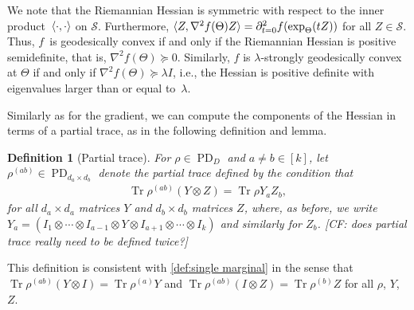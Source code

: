 \documentclass{article}
\newtheorem{definition}{Definition}
\newcommand{\ot}{\otimes}
\renewcommand{\vec}{\bm}
\newcommand\PD{\operatorname{PD}}
\newcommand\Sym{\mathcal{S}}
\newcommand\tr{\operatorname{Tr}}
\newcommand{\CF}[1]{{\color{purple}[CF: #1]}}
\newcommand{\MW}[1]{{\color{red}[MW: #1]}}
\begin{document}
We note that the Riemannian Hessian is symmetric with respect to the inner product~$\braket{\cdot,\cdot}$ on $\Sym$.
Furthermore, $\braket{Z, \nabla^2 f(\Theta) Z} = \partial^2_{t=0} f(\exp_{\Theta}(tZ))$ for all $Z\in \Sym$.
Thus, $f$~is geodesically convex if and only if the Riemannian Hessian is positive semidefinite, that is, $\nabla^2 f(\Theta) \succeq 0$.
Similarly, $f$ is $\lambda$-strongly geodesically convex at $\Theta$ if and only if $\nabla^2 f(\Theta) \succeq \lambda I$, i.e., the Hessian is positive definite with eigenvalues larger than or equal to~$\lambda$.

Similarly as for the gradient, we can compute the components of the Hessian in terms of a partial trace, as in the following definition and lemma.

\begin{definition}[Partial trace]
For $\rho \in \PD_D$ and $a \neq b\in[k]$, let $\rho^{(ab)} \in \PD_{d_a \times d_b}$ denote the \emph{partial trace} defined by the condition that
\begin{align*}
  \tr \rho^{(ab)} (Y \ot Z) = \tr \rho Y_a Z_b,
\end{align*}
for all $d_a \times d_a$ matrices $Y$ and $d_b \times d_b$ matrices $Z$, where, as before, we write~$Y_a = (I_1 \ot \cdots \ot I_{a-1} \ot Y \ot I_{a+1} \ot \cdots \ot I_k)$ and similarly for $Z_b$. \CF{does partial trace really need to be defined twice?}
\end{definition}

\noindent
This definition is consistent with \cref{def:single marginal} in the sense that $\tr \rho^{(ab)} (Y \ot I) = \tr \rho^{(a)} Y$ and $\tr \rho^{(ab)} (I \ot Z) = \tr \rho^{(b)} Z$ for all $\rho$, $Y$, $Z$.
\end{document}
